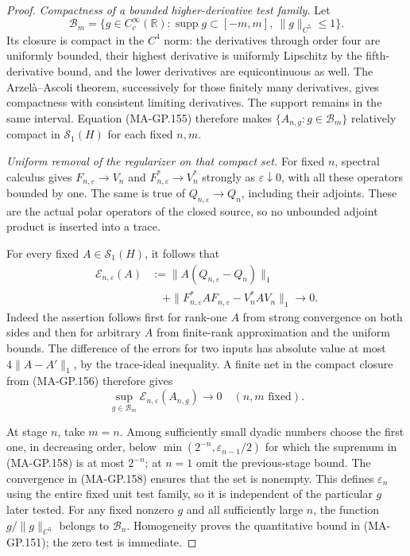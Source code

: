 \begin{proof}
\emph{Compactness of a bounded higher-derivative test family.}
Let
\[
 \mathcal B_m=\{g\in C_c^\infty(\mathbb R):
       \operatorname{supp}g\subset[-m,m],\ \|g\|_{C^5}\le1\}.
 \tag{MA-GP.156}
\]
Its closure is compact in the $C^4$ norm: the derivatives
through order four are uniformly bounded, their highest
derivative is uniformly Lipschitz by the fifth-derivative
bound, and the lower derivatives are equicontinuous as well.
The Arzel\`a--Ascoli theorem, successively for those finitely
many derivatives, gives compactness with consistent limiting
derivatives.  The support remains in the same interval.
Equation (MA-GP.155) therefore makes
$\{A_{n,g}:g\in\mathcal B_m\}$ relatively compact in
$\mathcal S_1(H)$ for each fixed $n,m$.

\emph{Uniform removal of the regularizer on that compact set.}
For fixed $n$, spectral calculus gives
$F_{n,\varepsilon}\to V_n$ and
$F_{n,\varepsilon}^*\to V_n^*$ strongly as
$\varepsilon\downarrow0$, with all these operators bounded
by one.  The same is true of $Q_{n,\varepsilon}\to Q_n$,
including their adjoints.  These are the actual polar
operators of the closed source, so no unbounded adjoint
product is inserted into a trace.

For every fixed $A\in\mathcal S_1(H)$, it follows that
\[
 \begin{split}
 \mathcal E_{n,\varepsilon}(A)
 &:=\|A(Q_{n,\varepsilon}-Q_n)\|_1\\
 &\quad+\|F_{n,\varepsilon}^*AF_{n,\varepsilon}
                              -V_n^*AV_n\|_1
                 \longrightarrow0.
 \end{split}
 \tag{MA-GP.157}
\]
Indeed the assertion follows first for rank-one $A$ from
strong convergence on both sides and then for arbitrary
$A$ from finite-rank approximation and the uniform bounds.
The difference of the errors for two inputs has absolute
value at most $4\|A-A'\|_1$, by the trace-ideal inequality.
A finite net in the compact closure from (MA-GP.156)
therefore gives
\[
 \sup_{g\in\mathcal B_m}
             \mathcal E_{n,\varepsilon}(A_{n,g})
                  \longrightarrow0
             \quad(n,m\text{ fixed}).
 \tag{MA-GP.158}
\]

At stage $n$, take $m=n$.  Among sufficiently small dyadic
numbers choose the first one, in decreasing order, below
$\min(2^{-n},\varepsilon_{n-1}/2)$ for which the supremum
in (MA-GP.158) is at most $2^{-n}$; at $n=1$ omit the
previous-stage bound.  The convergence in (MA-GP.158)
ensures that the set is nonempty.  This defines
$\varepsilon_n$ using the entire fixed unit test family,
so it is independent of the particular $g$ later tested.
For any fixed nonzero $g$ and all sufficiently large $n$,
the function $g/\|g\|_{C^5}$ belongs to $\mathcal B_n$.
Homogeneity proves the quantitative bound in (MA-GP.151);
the zero test is immediate.


\end{proof}
